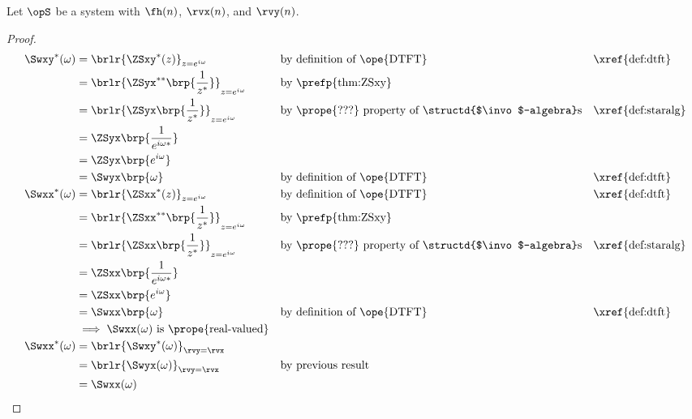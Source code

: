 \begin{corollary}
\label{cor:Swxy_sym}
Let $\opS$ be a system with  $\fh(n)$,
 $\rvx(n)$, and  $\rvy(n)$.
\end{corollary}
\begin{proof}
\begin{align*}
   \Swxy^\ast(\omega)
     &= \brlr{\ZSxy^\ast(z)}_{z=e^{i\omega}}
     && \text{by definition of \ope{DTFT}}
     && \text{\xref{def:dtft}}
   \\&= \brlr{\ZSyx^{\ast\ast}\brp{\frac{1}{z^\ast}}}_{z=e^{i\omega}}
     && \text{by \prefp{thm:ZSxy}}
   \\&= \brlr{\ZSyx\brp{\frac{1}{z^\ast}}}_{z=e^{i\omega}}
     && \text{by \prope{???} property of \structd{$\invo$-algebra}s}
     && \text{\xref{def:staralg}}
   \\&= \ZSyx\brp{\frac{1}{e^{i\omega\ast}}}
   \\&= \ZSyx\brp{e^{i\omega}}
   \\&= \Swyx\brp{\omega}
     && \text{by definition of \ope{DTFT}}
     && \text{\xref{def:dtft}}
   \\
   \Swxx^\ast(\omega)
     &= \brlr{\ZSxx^\ast(z)}_{z=e^{i\omega}}
     && \text{by definition of \ope{DTFT}}
     && \text{\xref{def:dtft}}
   \\&= \brlr{\ZSxx^{\ast\ast}\brp{\frac{1}{z^\ast}}}_{z=e^{i\omega}}
     && \text{by \prefp{thm:ZSxy}}
   \\&= \brlr{\ZSxx\brp{\frac{1}{z^\ast}}}_{z=e^{i\omega}}
     && \text{by \prope{???} property of \structd{$\invo$-algebra}s}
     && \text{\xref{def:staralg}}
   \\&= \ZSxx\brp{\frac{1}{e^{i\omega\ast}}}
   \\&= \ZSxx\brp{e^{i\omega}}
   \\&= \Swxx\brp{\omega}
     && \text{by definition of \ope{DTFT}}
     && \text{\xref{def:dtft}}
   \\&\implies\text{$\Swxx(\omega)$ is \prope{real-valued}}
   \\
   \Swxx^\ast(\omega)
     &= \brlr{\Swxy^\ast(\omega)}_{\rvy=\rvx}
   \\&= \brlr{\Swyx(\omega)}_{\rvy=\rvx}
     && \text{by previous result}
   \\&= \Swxx(\omega)
\end{align*}
\end{proof}






